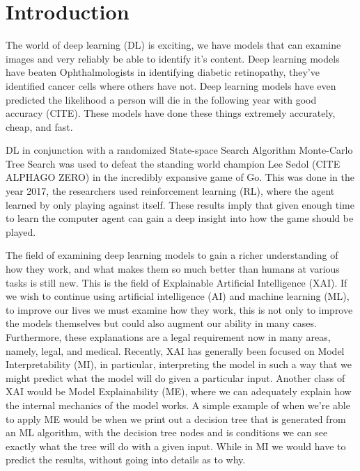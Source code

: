 \chapter{Introduction\label{cha:introduction}}


The world of deep learning (DL) is exciting, we have models that can examine
images and very reliably be able to identify it's content. Deep learning models have
beaten Ophthalmologists in identifying diabetic retinopathy, they've identified
cancer cells where others have not. Deep learning models have even predicted
the likelihood a person will die in the following year with good accuracy (CITE).
These models have done these things extremely accurately, cheap, and fast.

DL in conjunction with a randomized State-space Search Algorithm Monte-Carlo Tree Search was used to defeat the standing world champion Lee Sedol (CITE ALPHAGO ZERO) in the incredibly expansive game of Go. This was done in the year 2017, the researchers used reinforcement learning (RL), where the agent learned by only playing against itself. 
These results imply that given enough time to learn the computer agent can gain a deep insight into how the game should be played.  

The field of examining deep learning models to gain a richer understanding
of how they work, and what makes them so much better than humans at various tasks
is still new. This is the field of Explainable Artificial Intelligence (XAI).
If we wish to continue using artificial intelligence (AI) and machine learning (ML),
to improve our lives we must examine how they work, this is not only to improve
the models themselves but could also augment our ability in many cases.
Furthermore, these explanations are a legal requirement now in many areas, namely, legal, and
medical. Recently, XAI has generally been focused on Model Interpretability (MI), in
particular, interpreting the model in such a way that we might predict what the model will
do given a particular input. Another class of XAI would be Model Explainability (ME), where we can adequately explain how the internal mechanics of the model works.
A simple example of when we're able to apply ME would be when we print out a decision tree
that is generated from an ML algorithm, with the decision tree nodes and is conditions we can see exactly what the tree will do with a given input. While in MI we would have to predict the results, without going into details as to why.

